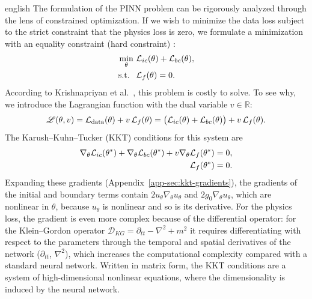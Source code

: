 \begin{hyphenrules}{english}
The formulation of the PINN problem can be rigorously analyzed through the lens of constrained
optimization. If we wish to minimize the data loss subject to the strict constraint that the physics
loss is zero, we formulate a minimization with an equality constraint (hard constraint)
\cite{krishnapriyan2021}:
\begin{align}
  \min_{\theta}\ &\mathcal{L}_{ic}(\theta)+\mathcal{L}_{bc}(\theta), \label{eq:hard-obj}\\
  \text{s.t. }\ &\mathcal{L}_f(\theta)=0. \label{eq:hard-constraint}
\end{align}
According to Krishnapriyan et al.~\cite{krishnapriyan2021}, this problem is costly to solve. To see why, we introduce the
Lagrangian function with the dual variable $v\in\mathbb{R}$:
\begin{equation}
  \mathscr{L}(\theta,v)=\mathcal{L}_{\mathrm{data}}(\theta)+v\,\mathcal{L}_f(\theta)
  =\big(\mathcal{L}_{ic}(\theta)+\mathcal{L}_{bc}(\theta)\big)+v\,\mathcal{L}_f(\theta).
  \label{eq:lagrangian}
\end{equation}
The Karush--Kuhn--Tucker (KKT) conditions for this system are \cite{boyd2004}
\begin{align}
  \nabla_\theta\mathcal{L}_{ic}(\theta^{*})+\nabla_\theta\mathcal{L}_{bc}(\theta^{*})+v\nabla_\theta\mathcal{L}_f(\theta^{*})&=0, \label{eq:kkt-1}\\
  \mathcal{L}_f(\theta^{*})&=0. \label{eq:kkt-2}
\end{align}
Expanding these gradients (Appendix~\ref{app-sec:kkt-gradients}), the gradients of the initial and boundary
terms contain $2u_\theta\nabla_\theta u_\theta$ and $2g_0\nabla_\theta u_\theta$, which are nonlinear in
$\theta$, because $u_\theta$ is nonlinear and so is its derivative. For the physics loss, the gradient is
even more complex because of the differential operator: for the Klein--Gordon operator
$\mathcal{D}_{KG}=\partial_{tt}-\nabla^2+m^2$ it requires differentiating with respect to the parameters
through the temporal and spatial derivatives of the network ($\partial_{tt}$, $\nabla^2$), which increases
the computational complexity compared with a standard neural network. Written in matrix form, the KKT
conditions are a system of high-dimensional nonlinear equations, where the dimensionality is induced by
the neural network.


\end{hyphenrules}
